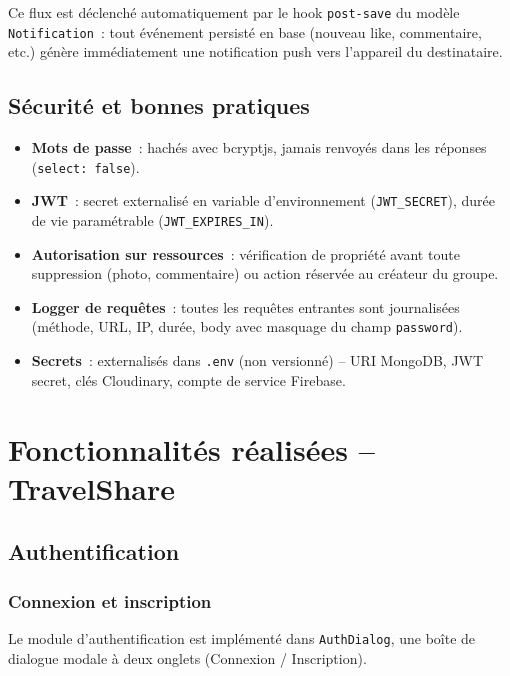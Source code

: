 \documentclass[12pt, a4paper, openany]{report}
\begin{document}
Ce flux est déclenché automatiquement par le hook \texttt{post-save} du modèle
\texttt{Notification}~: tout événement persisté en base (nouveau like, commentaire, etc.)
génère immédiatement une notification push vers l'appareil du destinataire.

\section{Sécurité et bonnes pratiques}

\begin{itemize}
  \item \textbf{Mots de passe}~: hachés avec bcryptjs, jamais renvoyés dans les réponses
        (\texttt{select: false}).
  \item \textbf{JWT}~: secret externalisé en variable d'environnement
        (\texttt{JWT\_SECRET}), durée de vie paramétrable (\texttt{JWT\_EXPIRES\_IN}).
  \item \textbf{Autorisation sur ressources}~: vérification de propriété avant toute
        suppression (photo, commentaire) ou action réservée au créateur du groupe.
  \item \textbf{Logger de requêtes}~: toutes les requêtes entrantes sont journalisées
        (méthode, URL, IP, durée, body avec masquage du champ \texttt{password}).
  \item \textbf{Secrets}~: externalisés dans \texttt{.env} (non versionné) -- URI MongoDB,
        JWT secret, clés Cloudinary, compte de service Firebase.
\end{itemize}

\chapter{Fonctionnalités réalisées -- TravelShare}

\section{Authentification}

\subsection{Connexion et inscription}

Le module d'authentification est implémenté dans \texttt{AuthDialog}, une boîte de dialogue
modale à deux onglets (Connexion / Inscription).
\end{document}

